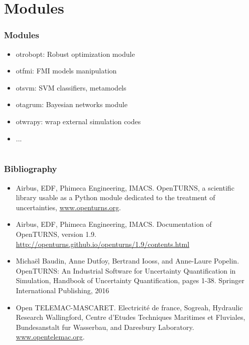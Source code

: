 \documentclass{beamer}
\begin{document}

\section{Modules}

\begin{frame}[containsverbatim]
\frametitle{Modules}

\begin{itemize}
\item otrobopt: Robust optimization module

\item otfmi: FMI models manipulation

\item otsvm: SVM classifiers, metamodels

\item otagrum: Bayesian networks module

\item otwrapy: wrap external simulation codes

\item ...
\end{itemize}

\end{frame}


\section{}

\begin{frame}
\frametitle{Bibliography}

\begin{itemize}
\item Airbus, EDF, Phimeca Engineering, IMACS. 
OpenTURNS, a scientific library usable as a Python module dedicated to the treatment of uncertainties, 
\url{www.openturns.org}.
\item Airbus, EDF, Phimeca Engineering, IMACS. Documentation of OpenTURNS, version 1.9. 
\url{http://openturns.github.io/openturns/1.9/contents.html}
\item  Michaël Baudin, Anne Dutfoy, Bertrand Iooss, and Anne-Laure Popelin. 
OpenTURNS: An Industrial Software for Uncertainty Quantification in Simulation, 
Handbook of Uncertainty Quantification, 
pages 1-38. Springer International Publishing, 2016
\item Open TELEMAC-MASCARET. 
Electricité de france, Sogreah, Hydraulic Research Wallingford, 
Centre d'Etudes Techniques Maritimes et Fluviales, Bundesanstalt fur Wasserbau, and Daresbury Laboratory.
\url{www.opentelemac.org}.
\end{itemize}

\end{frame}
\end{document}
